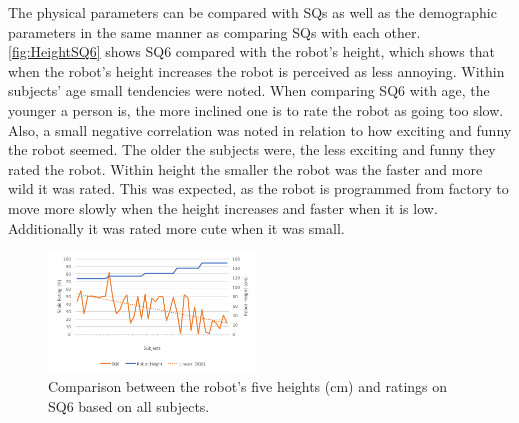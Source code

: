 The physical parameters can be compared with SQs as well as the demographic parameters in the same manner as comparing SQs with each other. \autoref{fig:HeightSQ6} shows SQ6 compared with the robot's height, which shows that when the robot's height increases the robot is perceived as less annoying. Within subjects' age small tendencies were noted. When comparing SQ6 with age, the younger a person is, the more inclined one is to rate the robot as going too slow. Also, a small negative correlation was noted in relation to how exciting and funny the robot seemed. The older the subjects were, the less exciting and funny they rated the robot. Within height the smaller the robot was the faster and more wild it was rated. This was expected, as the robot is programmed from factory to move more slowly when the height increases and faster when it is low. Additionally it was rated more cute when it was small.
%
\begin{figure}[H]
	\centering
	\includegraphics[width = 0.49\textwidth]{Figure/HeightSQ6}
	\setlength{} 
	\caption{Comparison between the robot's five heights (cm) and ratings on SQ6 based on all subjects.}
	\label{fig:HeightSQ6}
\end{figure}
\noindent
%
